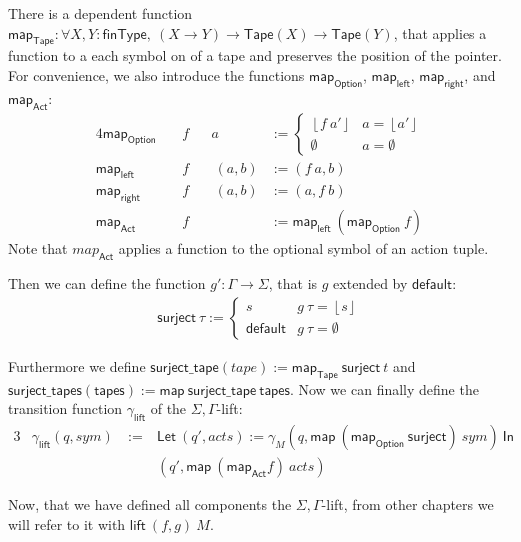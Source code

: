 \documentclass{psartcl}
\newcommand{\MS}[1]{\textsf{#1}}
\newcommand{\from}{:}
\renewcommand{\to}{\rightarrow}
\newcommand{\Option}{\MS{Option}}
\newcommand{\Some}[1]{\left\lfloor #1\right\rfloor}
\renewcommand{\None}{\emptyset}
\newcommand{\Tape}{\MS{Tape}}
\newcommand{\Tau}{\Gamma}
\newcommand{\mlet}[2]{\MS{Let}~#1~\MS{In}~#2}
\newcommand{\map}{\ensuremath{\MS{map}}}
\begin{document}
There is a dependent function $\map_\Tape:\forall X, Y:\MS{finType},~(X \to Y) \to \Tape(X) \to \Tape(Y)$, that applies a function to a each symbol
on of a tape and preserves the position of the pointer.
For convenience, we also introduce the functions $\map_\Option$, $\map_\MS{left}$, $\map_\MS{right}$, and $\map_\MS{Act}$:
\begin{alignat*}{4}
  \map_\Option &&~ f && a &:=
    \begin{cases}
      \Some{f~a'} & a = \Some{a'} \\
      \None       & a = \None
    \end{cases} \\
    \map_\MS{left}  &&~ f &&~ (a, b) &:= (f~a, b) \\
    \map_\MS{right} &&~ f &&~ (a, b) &:= (a, f~b) \\
    \map_\MS{Act}   &&~ f &&         &:= \map_\MS{left}~(\map_\Option~f)
\end{alignat*}
Note that $map_\MS{Act}$ applies a function to the optional symbol of an action tuple.

Then we can define the function $g' \from \Tau \to \Sigma$, that is $g$ extended by $\MS{default}$:
\begin{align*}
  \MS{surject}~\tau :=
  \begin{cases}
    s            & g~\tau = \Some{s} \\
    \MS{default} & g~\tau = \None
  \end{cases}
\end{align*}

Furthermore we define $\MS{surject\_tape}(tape) := \map_\Tape~\MS{surject}~t$ and
$\MS{surject\_tapes}(\MS{tapes}) := \map~\MS{surject\_tape}~\MS{tapes}$.
Now we can finally define the transition function $\gamma_\MS{lift}$ of the $\Sigma,\Tau$-lift:
\begin{alignat*}{3}
  &\gamma_\MS{lift} (q, sym) &~:=~& \mlet {(q', acts) := \gamma_M(q, \map~(\map_\Option~\MS{surject})~sym)}{\\
  &                          &~  ~& (q', \map~(\map_\MS{Act} f)~acts)}
\end{alignat*}

Now, that we have defined all components the $\Sigma,\Tau$-lift, from other chapters we will refer to it with $\MS{lift}~(f,g)~M$.
\end{document}
